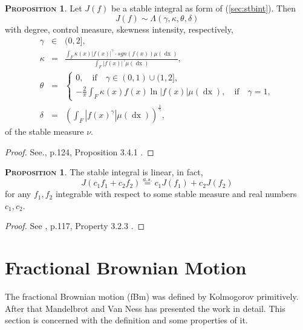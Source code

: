 \documentclass[a4paper, twoside, 11pt]{article}
\theoremstyle{definition}
\newtheorem{proposition}[definition]{\scshape Proposition}
\newcommand{\brkt}[1]{\left({#1} \right)}
\begin{document}
\begin{proposition}
  Let $J(f)$ be a stable integral as form of (\ref{sec:stbint}). Then 
  \begin{equation*}
	J(f) \sim \Lambda(\gamma, \kappa, \theta, \delta)
  \end{equation*}
with degree, control measure, skewness intensity, respectively, 
\begin{eqnarray*}
\gamma &\in& (0, 2],\\
\kappa &=& \frac{\int_F \kappa(x) |f(x)|^\gamma\cdot sgn(f(x)) \mu(\mathop{dx})}{\int_F|f(x)|^\gamma\mu(\mathop{dx})},\\
\theta &=&
\begin{cases}
0 , \hspace{1em} \text{if} \hspace{1em} \gamma \in (0, 1) \cup (1, 2],\\
  -\frac{2}{\pi}\int_F \kappa(x) f(x) \ln|f(x)|\mu(\mathop{dx}), \hspace{1em} \text{if} \hspace{1em} \gamma = 1,
\end{cases}\\
\delta &=& \brkt{\int_F |f(x)^\gamma|\mu(\mathop{dx})}^{\frac{1}{\gamma}}, 
\end{eqnarray*}
of the stable measure $\nu$.
\label{sec:stbint2}
\end{proposition}
\begin{proof}
  See.\cite{samorodnitsky}, p.124, Proposition 3.4.1 .
\end{proof}
\begin{proposition}
  The stable integral is linear, in fact,
\begin{equation}
  J(c_1f_1 + c_2f_2) \overset{a.s.}{=}c_1J(f_1) + c_2J(f_2)
  \label{sec:stblin}
\end{equation}
for any $f_1, f_2$ integrable with respect to some stable measure and real numbers $c_1, c_2$. 
\end{proposition}
\begin{proof}
  See \cite{samorodnitsky}, p.117, Property 3.2.3 .
\end{proof}
\newpage
\section{Fractional Brownian Motion}
\setcounter{equation}{0}
The fractional Brownian motion (fBm) was defined by Kolmogorov primitively. After that Mandelbrot and Van Ness has presented the work in detail. This section is concerned with the definition and some properties of it.
\end{document}
